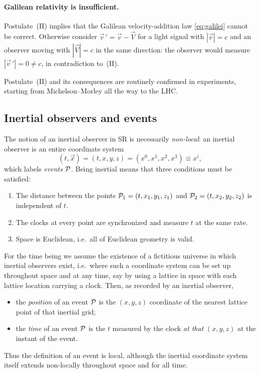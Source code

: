 \paragraph{Galilean relativity is insufficient.}
Postulate~(II) implies that the Galilean velocity-addition law \eqref{eq:galilei} cannot be
correct. Otherwise consider $\vec{v}\,' = \vec{v} - \vec{V}$ for a light signal with
$|\vec{v}| = c$ and an observer moving with $|\vec{V}| = c$ in the same direction: the observer
would measure $|\vec{v}\,'| = 0 \neq c$, in contradiction to~(II).

Postulate~(II) and its consequences are routinely confirmed in experiments, starting from
Michelson--Morley all the way to the LHC.

\subsection{Inertial observers and events}
\label{sec:sr_inertial}

The notion of an inertial observer in SR is necessarily \emph{non-local}: an inertial observer is
an entire coordinate system
\begin{equation}
    (t, \vec{x}) = (t, x, y, z) = (x^0, x^1, x^2, x^3) \equiv x^i ,
\end{equation}
which labels \emph{events} $\mathcal{P}$. Being inertial means that three conditions must be satisfied:
\begin{enumerate}[leftmargin=*]
    \item The distance between the points $\mathcal{P}_1 = (t, x_1, y_1, z_1)$ and
          $\mathcal{P}_2 = (t, x_2, y_2, z_2)$ is independent of $t$.
    \item The clocks at every point are synchronized and measure $t$ at the same rate.
    \item Space is Euclidean, i.e.\ all of Euclidean geometry is valid.
\end{enumerate}

For the time being we assume the existence of a fictitious universe in which inertial observers
exist, i.e.\ where such a coordinate system can be set up throughout space and at any time, say
by using a lattice in space with each lattice location carrying a clock. Then, as recorded by an
inertial observer,
\begin{itemize}[leftmargin=*]
    \item the \emph{position} of an event $\mathcal{P}$ is the $(x, y, z)$ coordinate of the nearest
          lattice point of that inertial grid;
    \item the \emph{time} of an event $\mathcal{P}$ is the $t$ measured by the clock \emph{at that}
          $(x, y, z)$ at the instant of the event.
\end{itemize}
Thus the definition of an event is local, although the inertial coordinate system itself extends
non-locally throughout space and for all time.

